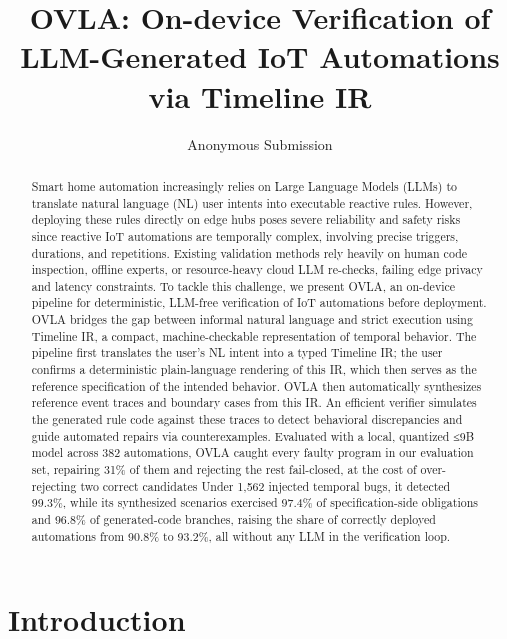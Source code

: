 \documentclass[sigconf,nonacm,anonymous,review]{acmart}
\title{OVLA: On-device Verification of LLM-Generated IoT Automations via Timeline IR}
\author{Anonymous Submission}
\affiliation{\institution{Submitted to SenSys 2027}\country{}}
\begin{document}
\begin{abstract}
Smart home automation increasingly relies on Large Language Models (LLMs) to translate natural language (NL) user intents into executable reactive rules. However, deploying these rules directly on edge hubs poses severe reliability and safety risks since reactive IoT automations are temporally complex, involving precise triggers, durations, and repetitions. Existing validation methods rely heavily on human code inspection, offline experts, or resource-heavy cloud LLM re-checks, failing edge privacy and latency constraints. To tackle this challenge, we present OVLA, an on-device pipeline for deterministic, LLM-free verification of IoT automations before deployment. OVLA bridges the gap between informal natural language and strict execution using Timeline IR, a compact, machine-checkable representation of temporal behavior. The pipeline first translates the user's NL intent into a typed Timeline IR; the user confirms a deterministic plain-language rendering of this IR, which then serves as the reference specification of the intended behavior. OVLA then automatically synthesizes reference event traces and boundary cases from this IR. An efficient verifier simulates the generated rule code against these traces to detect behavioral discrepancies and guide automated repairs via counterexamples. Evaluated with a local, quantized ≤9B model across 382 automations, OVLA caught every faulty program in our evaluation set, repairing 31\% of them and rejecting the rest fail-closed, at the cost of over-rejecting two correct candidates Under 1,562 injected temporal bugs, it detected 99.3\%, while its synthesized scenarios exercised 97.4\% of specification-side obligations and 96.8\% of generated-code branches, raising the share of correctly deployed automations from 90.8\% to 93.2\%, all without any LLM in the verification loop.
\end{abstract}


\maketitle

\section{Introduction}
\end{document}
